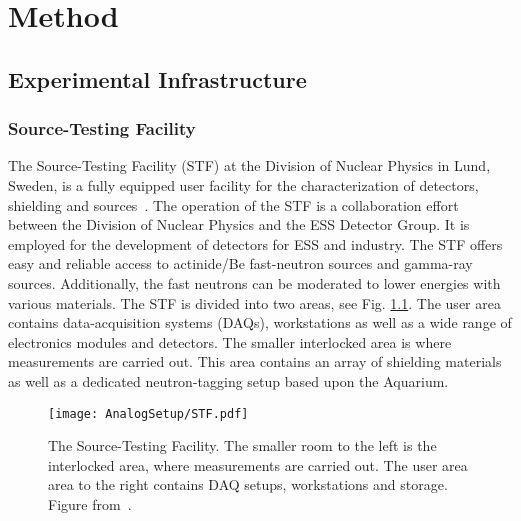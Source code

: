 \documentclass[main.tex]{subfiles}
\begin{document}
\chapter{Method}
\section{Experimental Infrastructure}
\subsection{Source-Testing Facility}
The Source-Testing Facility (STF) at the Division of Nuclear Physics in Lund, Sweden, is a fully equipped user facility for the characterization of detectors, shielding and sources~\cite{Messi}.
The operation of the STF is a collaboration effort between the Division of Nuclear Physics and the ESS Detector Group. It is employed for the development of detectors for ESS and industry. The STF offers easy and reliable access to actinide/Be fast-neutron sources and gamma-ray sources. Additionally, the fast neutrons can be moderated to lower energies with various materials. The STF is divided into two areas, see Fig. \ref{fig:STF}. The user area contains data-acquisition systems (DAQs), workstations as well as a wide range of electronics modules and detectors. The smaller interlocked area is where measurements are carried out. This area contains an array of shielding materials as well as a dedicated neutron-tagging setup based upon the Aquarium.

\begin{figure}[ht]
	\center
    	\texttt{[image: AnalogSetup/STF.pdf]}
	\caption[The Source-Testing Facility.]{The Source-Testing Facility. The smaller room to the left is the interlocked area, where measurements are carried out. The user area area to the right contains DAQ setups, workstations and storage. Figure from~\cite{Messi}.}
	\label{fig:STF}
\end{figure}
\end{document}
